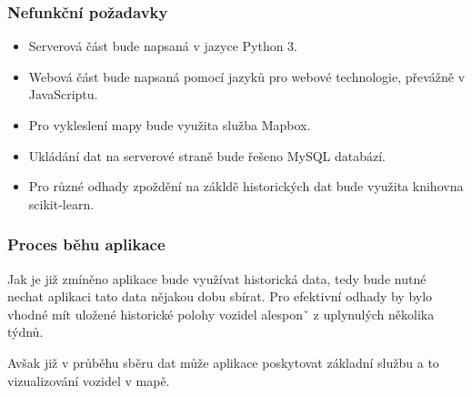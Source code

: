 \subsubsection{Nefunkční požadavky}

\begin{itemize}
	\item Serverová část bude napsaná v jazyce Python 3.

	\item Webová část bude napsaná pomocí jazyků pro webové technologie, převážně v JavaScriptu.

	\item Pro vykleslení mapy bude využita služba Mapbox.

	\item Ukládání dat na serverové straně bude řešeno MySQL databází.

	\item Pro různé odhady zpoždění na zákldě historických dat bude využita knihovna scikit-learn.

\end{itemize}

\subsubsection{Proces běhu aplikace}

Jak je již zmíněno aplikace bude využívat historická data, tedy bude nutné nechat aplikaci tato data nějakou dobu sbírat. Pro efektivní odhady by bylo vhodné mít uložené historické polohy vozidel alesponˇ z uplynulých několika týdnů.

\bigbreak

Avšak již v průběhu sběru dat může aplikace poskytovat základní službu a to vizualizování vozidel v mapě.
